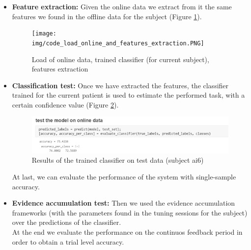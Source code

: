 \begin{itemize}
\item \textbf{Feature extraction:} Given the online data we extract from it the same features we found in the offline data for the subject (Figure \ref{fig:load_online_data_classifier_features_extraction}). 

\begin{figure}[h!]
	\begin{center}
		 \texttt{[image: img/code\_load\_online\_and\_features\_extraction.PNG]}
	\end{center}

	 \caption{Load of online data, trained classifier (for current subject), features  extraction}
	 \label{fig:load_online_data_classifier_features_extraction}
\end{figure}



\item \textbf{Classification test:} Once we have extracted the features, the classifier trained for the current patient is used to estimate the performed task, with a certain confidence value (Figure \ref{fig:test_results_ai6}). \\

\begin{figure}[h!]
	\begin{center}
		 \includegraphics[width=0.7\linewidth]{img/code_test_set_results_ai6.PNG}
	\end{center}

	 \caption{Results of the trained classifier on test data (subject ai6)}
	 \label{fig:test_results_ai6}
\end{figure}

At last, we can evaluate the performance of the system with single-sample accuracy.
\item \textbf{Evidence accumulation test:} Then we used the evidence accumulation frameworks (with the parameters found in the tuning sessions for the subject) over the predictions of the classifier.\\
At the end we evaluate the performance on the continuos feedback period in order to obtain a trial level accuracy.
\end{itemize}